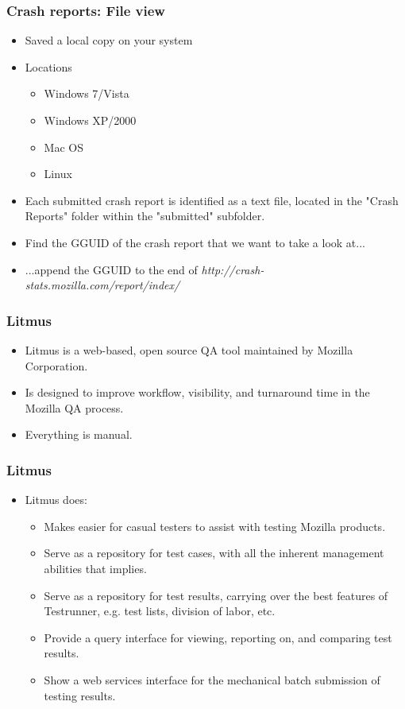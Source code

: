 \documentclass{beamer}
\begin{document}
\begin{frame}
\frametitle{Crash reports: File view}
 \begin{itemize}
  \item Saved a local copy on your system
  \item Locations
    \begin{itemize}
      \item Windows 7/Vista
      \item Windows XP/2000
      \item Mac OS
      \item Linux
    \end{itemize}
  \item Each submitted crash report is identified as a text file, located in the "Crash Reports" folder within the "submitted" subfolder.
  \item Find the GGUID of the crash report that we want to take a look at...
  \item ...append the GGUID to the end of \textit{http://crash-stats.mozilla.com/report/index/}
 \end{itemize}
\end{frame}



\begin{frame}
\frametitle{Litmus}
 \begin{itemize}
    \item Litmus is a web-based, open source QA tool maintained by Mozilla Corporation.
    \item Is designed to improve workflow, visibility, and turnaround time in the Mozilla QA process.
    \item Everything is manual.
 \end{itemize}

\end{frame}

\begin{frame}
\frametitle{Litmus}
 \begin{itemize}
    \item Litmus does:
       \begin{itemize}
       \item Makes easier for casual testers to assist with testing Mozilla products.
       \item Serve as a repository for test cases, with all the inherent management abilities that implies.
       \item Serve as a repository for test results, carrying over the best features of Testrunner, e.g. test lists, division of labor, etc.
       \item Provide a query interface for viewing, reporting on, and comparing test results.
       \item Show a web services interface for the mechanical batch submission of testing results.
       \end{itemize}
 \end{itemize}
\end{frame}
\end{document}

